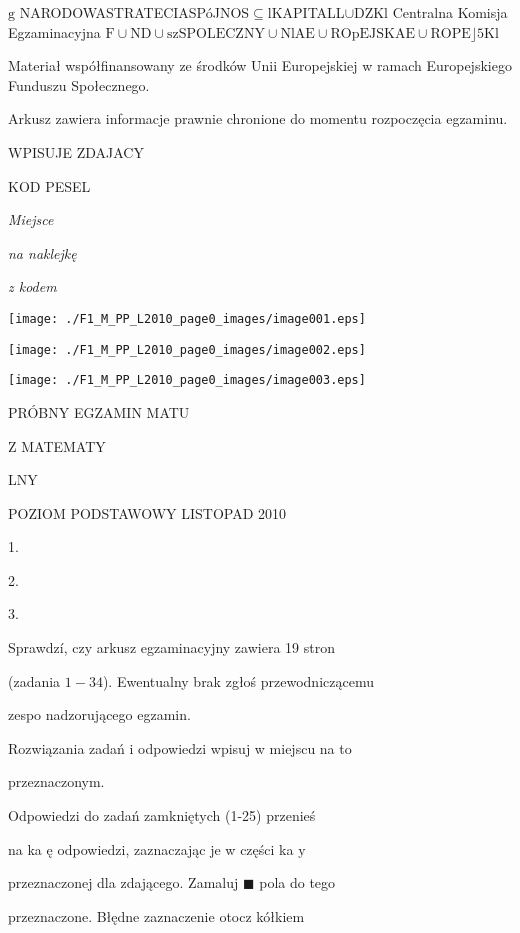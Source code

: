 \documentclass[a4paper,12pt]{article}
\begin{document}
$\mathrm{g}$ NARODOWASTRATECIASPóJNOS$\subseteq$lKAPITALL$\cup$DZKl Centralna Komisja Egzaminacyjna $\mathrm{F}\cup \mathrm{N}\mathrm{D}\cup \mathrm{s}\mathrm{z}\mathrm{S}\mathrm{P}\mathrm{O}\mathrm{L}\mathrm{E}\mathrm{C}\mathrm{Z}\mathrm{N}\mathrm{Y}\cup \mathrm{N}\mathrm{l}\mathrm{A}\mathrm{E}\cup \mathrm{R}\mathrm{O}\mathrm{p}\mathrm{E}\mathrm{J}\mathrm{S}\mathrm{K}\mathrm{A}\mathrm{E}\cup \mathrm{R}\mathrm{O}\mathrm{P}\mathrm{E}\rfloor 5\mathrm{K}\mathrm{l}$\fbox{}

Materiał współfinansowany ze środków Unii Europejskiej w ramach Europejskiego Funduszu Społecznego.

Arkusz zawiera informacje prawnie chronione do momentu rozpoczęcia egzaminu.

WPISUJE ZDAJACY

KOD PESEL

{\it Miejsce}

{\it na naklejkę}

{\it z kodem}
\begin{center}
\texttt{[image: ./F1\_M\_PP\_L2010\_page0\_images/image001.eps]}

\texttt{[image: ./F1\_M\_PP\_L2010\_page0\_images/image002.eps]}

\texttt{[image: ./F1\_M\_PP\_L2010\_page0\_images/image003.eps]}
\end{center}
PRÓBNY EGZAMIN MATU

Z MATEMATY

LNY

POZIOM PODSTAWOWY  LISTOPAD 2010

1.

2.

3.

Sprawdzí, czy arkusz egzaminacyjny zawiera 19 stron

(zadania $1-34$). Ewentualny brak zgłoś przewodniczącemu

zespo nadzorującego egzamin.

Rozwiązania zadań i odpowiedzi wpisuj w miejscu na to

przeznaczonym.

Odpowiedzi do zadań zamkniętych (1-25) przenieś

na ka ę odpowiedzi, zaznaczając je w części ka $\mathrm{y}$

przeznaczonej dla zdającego. Zamaluj $\blacksquare$ pola do tego

przeznaczone. Błędne zaznaczenie otocz kółkiem
\end{document}

